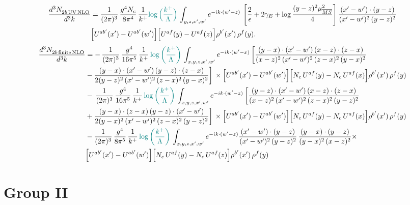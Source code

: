 \documentclass[9pt]{article}
\numberwithin{equation}{section}
\begin{document}
\begin{align}
\frac{d^{3}N_{2b\,\rm UV\, NLO}^{\rm}}{d^{3}k} & = \frac{1}{(2\pi)^{3}}\,\frac{g^{4}N_{c}}{8\pi^{4}}\,\frac{1}{k^{+}}
{\color{teal}\log\Big(\frac{k^{+}}{\Lambda}\Big)}\,\int_{y,z,x',w'}e^{-ik\cdot(w'-z)}\, \left[\frac{2}{\epsilon}+2\gamma_{E}+\log\frac{(y-z)^{2}\mu^{2}_{\overline{MS}}}{4}\right]
\frac{(x'-w')\cdot(y-z)}{(x'-w')^{2}\,(y-z)^{2}}\notag \\ &  \Big[U^{ab'}(x')-U^{ab'}(w')\Big]\Big[U^{af}(y)-U^{af}(z)\Big]\rho^{b'}(x')\,\rho^{f}(y).
\end{align}
\begin{align}
    \frac{d^{3}N_{2b\,\rm finite\, NLO}^{\rm}}{d^{3}k} & =  -\, \frac{1}{(2\pi)^{3}}\,\frac{g^{4}}{16\pi^{5}}\,\frac{1}{k^{+}}\,{\color{teal}\log{\left(\frac{k^{+}}{\Lambda}\right)}}\,\int_{x,y,z,x',w'}e^{-ik\cdot(w'-x)}\, \bigg[\frac{(y-x)\cdot (x'-w')\,(x-z)\cdot (z-x)}{(x-z)^{2}\,(x'-w')^{2}\,(z-x)^{2}\,(y-x)^{2}}\notag \\ & -\frac{(y-x)\cdot (x'-w')\,(y-z)\cdot (z-x)}{2(y-z)^{2}\,(x'-w')^{2}\,(z-x)^{2}\,(y-x)^{2}}\bigg]\,\times \Big[U^{ab'}(x')-U^{ab'}(w')\Big]\Big[N_{c}\,U^{af}(y)-N_{c}\,U^{af}(x)\Big]\rho^{b'}(x')\,\rho^{f}(y)\notag \\ & -\, \frac{1}{(2\pi)^{3}}\,\frac{g^{4}}{16\pi^{5}}\,\frac{1}{k^{+}}\,{\color{teal}\log{\left(\frac{k^{+}}{\Lambda}\right)}}\,\int_{x,y,z,x',w'}e^{-ik\cdot(w'-z)}\,\bigg[\frac{(y-z)\cdot (x'-w')\,(x-z)\cdot (z-x)}{(x-z)^{2}\,(x'-w')^{2}\,(z-x)^{2}\,(y-z)^{2}}\notag \\ & +\frac{(y-x)\cdot (z-x)\,(y-z)\cdot (x'-w')}{2(y-x)^{2}\,(x'-w')^{2}\,(z-x)^{2}\,(y-z)^{2}}\bigg]\,\times \Big[U^{ab'}(x')-U^{ab'}(w')\Big]\Big[N_{c}\,U^{af}(y)-N_{c}\,U^{af}(x)\Big]\rho^{b'}(x')\,\rho^{f}(y)\notag \\ & - \frac{1}{(2\pi)^{3}}\,\frac{g^{4}}{8\pi^{5}}\,\frac{1}{k^{+}}\,{\color{teal}\log{\left(\frac{k^{+}}{\Lambda}\right)}}\,\int_{x,y,z,x',w'}e^{-ik\cdot(w'-z)} \frac{(x'-w')\cdot(y-z)}{(x'-w')^{2}\,(y-z)^{2}}\,\frac{(y-x)\cdot(y-z)}{(y-x)^{2}\,(x-z)^{2}}\times\notag \\ & \Big[U^{ab'}(x')-U^{ab'}(w')\Big]\Big[N_{c}\,U^{af}(y)-N_{c}\,U^{af}(z)\Big]\rho^{b'}(x')\,\rho^{f}(y)
\end{align}
\section{Group II}
\end{document}
